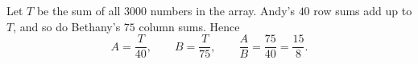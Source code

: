 Let $T$ be the sum of all $3000$ numbers in the array. Andy's $40$ row sums add up to $T$, and so do Bethany's $75$ column sums. Hence
\[A=\dfrac{T}{40},\qquad B=\dfrac{T}{75},\qquad \dfrac {A}{B}=\dfrac{75}{40}=\boxed{\dfrac{15}{8}}.\]
